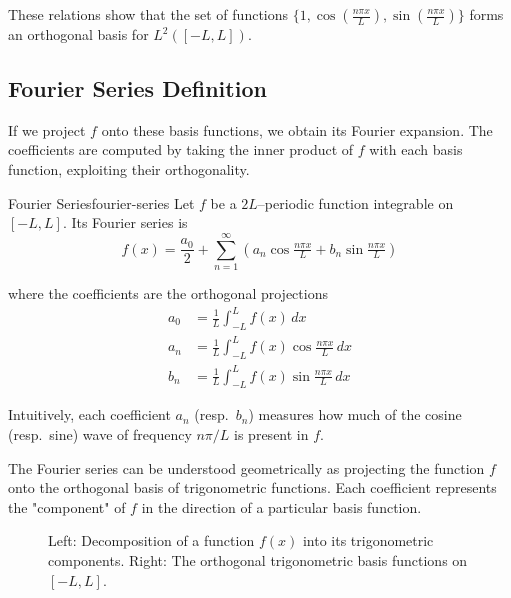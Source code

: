 These relations show that the set of functions \( \{1, \cos(\frac{n\pi x}{L}), \sin(\frac{n\pi x}{L}) \} \) forms an orthogonal basis for \( L^2([-L, L]) \).

\subsection{Fourier Series Definition}
If we project \(f\) onto these basis functions, we obtain its Fourier expansion. The coefficients are computed by taking the inner product of \(f\) with each basis function, exploiting their orthogonality.

\begin{definition}{Fourier Series}{fourier-series}
    Let \(f\) be a \(2L\)--periodic function integrable on \([-L,L]\).  Its Fourier series is
    \begin{equation}
        f(x) = \frac{a_0}{2} +\sum_{n=1}^{\infty} \left(a_n\cos\tfrac{n\pi x}{L} +b_n\sin \tfrac{n\pi x}{L}\right)
    \end{equation}

    where the coefficients are the orthogonal projections
    \begin{align*}
        a_0 & =\frac{1}{L}\int_{-L}^{L}f(x)\, dx                      \\
        a_n & =\frac{1}{L}\int_{-L}^{L}f(x)\cos\tfrac{n\pi x}{L}\, dx \\
        b_n & =\frac{1}{L}\int_{-L}^{L}f(x)\sin\tfrac{n\pi x}{L}\, dx
    \end{align*}
\end{definition}

Intuitively, each coefficient \(a_n\) (resp.\ \(b_n\)) measures how much of the cosine (resp.\ sine) wave of frequency \(n\pi/L\) is present in \(f\).

The Fourier series can be understood geometrically as projecting the function \(f\) onto the orthogonal basis of trigonometric functions. Each coefficient represents the "component" of \(f\) in the direction of a particular basis function.

\begin{figure}[htbp]
    \centering
    
    \hfill
    
    \caption{
        Left: Decomposition of a function \(f(x)\) into its trigonometric components.
        Right: The orthogonal trigonometric basis functions on \([-L, L]\).
    }
    \label{fig:fourier-orthogonal-projection}
\end{figure}

